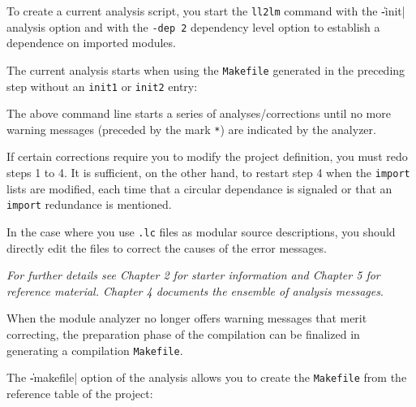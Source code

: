 To create a current analysis script, you start the {\tt ll2lm} command with the \|-init| analysis option and with the {\tt -dep 2} dependency level option to establish a dependence on imported modules. 

\begin{Code*}
\end{Code*}


The current analysis starts when using the {\tt Makefile} generated in the preceding step without an {\tt init1} or {\tt init2} entry:
\begin{Code*}
\end{Code*}

The above command line starts a series of analyses/corrections until no more warning messages (preceded by the mark {\tt **}) are indicated by the analyzer.

If certain corrections require you to modify the project definition, you must redo steps 1 to 4.  It is sufficient, on the other hand, to restart step 4 when the {\tt import} lists are modified, each time that a circular dependance is signaled or that an {\tt import} redundance is mentioned.

In the case where you use {\tt .lc} files as modular source descriptions, you should directly edit the files to correct the causes of the error messages.

\medskip 

{\em For further details see Chapter 2 for starter information and Chapter 5 for
 reference material.  Chapter 4 documents the ensemble of analysis messages}.


When the module analyzer no longer offers warning messages that merit correcting, the preparation phase of the compilation can be finalized in generating a compilation {\tt Makefile}.

The \|-makefile| option of the analysis allows you to create the {\tt Makefile} from the reference table of the project:  

\begin{Code*}
\end{Code*}

